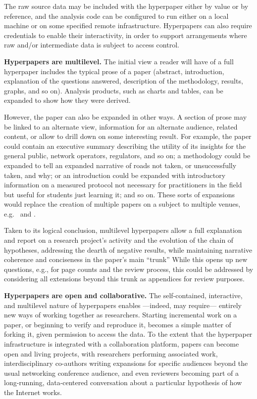 \documentclass[sigconf]{acmart}
\begin{document}
The raw source data may be included with the hyperpaper either by value or by
reference, and the analysis code can be configured to run either on a local
machine or on some specified remote infrastructure. Hyperpapers can also require
credentials to enable their interactivity, in order to support arrangements
where raw and/or intermediate data is subject to access control.

\textbf{Hyperpapers are multilevel.} The initial view a reader will have of a
full hyperpaper includes the typical prose of a paper (abstract, introduction,
explanation of the questions answered, description of the methodology, results,
graphs, and so on). Analysis products, such as charts and tables, can be
expanded to show how they were derived.

However, the paper can also be expanded in other ways. A section of prose may
be linked to an alternate view, information for an alternate audience, related
content, or allow to drill down on some interesting result. For example, the
paper could contain an executive summary describing the utility of its insights
for the general public, network operators, regulators, and so on; a methodology
could be expanded to tell an expanded narrative of roads not taken, or
unsuccessfully taken, and why; or an introduction could be expanded with
introductory information on a measured protocol not necessary for practitioners
in the field but useful for students just learning it; and so on.  These sorts
of expansions would replace the creation of multiple papers on a subject to
multiple venues, e.g.~\cite{Dhamdhere18} and \cite{Clark18}.

Taken to its logical conclusion, multilevel hyperpapers allow a full explanation
and report on a research project's activity and the evolution of the chain of
hypotheses, addressing the dearth of negative results, while maintaining
narrative coherence and conciseness in the paper's main ``trunk'' While this
opens up new questions, e.g., for page counts and the review process, this
could be addressed by considering all extensions beyond this trunk as appendices
for review purposes.

\textbf{Hyperpapers are open and collaborative.}  The self-contained,
interactive, and multilevel nature of hyperpapers enables ---indeed, may
require--- entirely new ways of working together as researchers. Starting
incremental work on a paper, or beginning to verify and reproduce it, becomes a
simple matter of forking it, given permission to access the data. To the extent
that the hyperpaper infrastructure is integrated with a collaboration platform,
papers can become open and living projects, with researchers performing
associated work, interdisciplinary co-authors writing expansions for specific
audiences beyond the usual networking conference audience, and even reviewers
becoming part of a long-running, data-centered conversation about a particular
hypothesis of how the Internet works.
\end{document}
